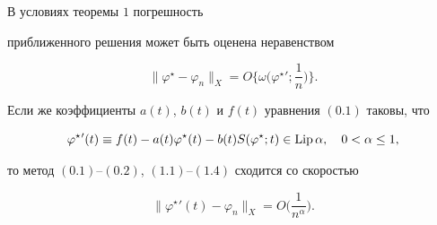 \begin{thm}


В условиях теоремы $1$ погрешность 


приближенного решения может быть оценена неравенством


\begin{equation}


\|\varphi^{\star}-\varphi_n\|_X=O\bigg\{\omega\bigg(\varphi^{\star}{}';


\frac{1}{n}\bigg)\bigg\}. 


\end{equation}


Если же коэффициенты $a(t)$, $b(t)$ и $f(t)$ уравнения $(0.1)$ таковы, что


\begin{equation}


\varphi^{\star}{}'(t)\equiv f(t)-a(t)\varphi^{\star}(t)-b(t)S(\varphi^


{\star};t)\in \Lip \alpha, \quad 0<\alpha\leq 1, 


\end{equation}


то метод $(0.1)$--$(0.2)$, $(1.1)$--$(1.4)$ сходится со скоростью


\begin{equation}


\|\varphi^{\star}{}'(t)-\varphi_n\|_X=O\bigg(\frac{1}{n^{\alpha}}\bigg). 


\end{equation}


\end{thm}






